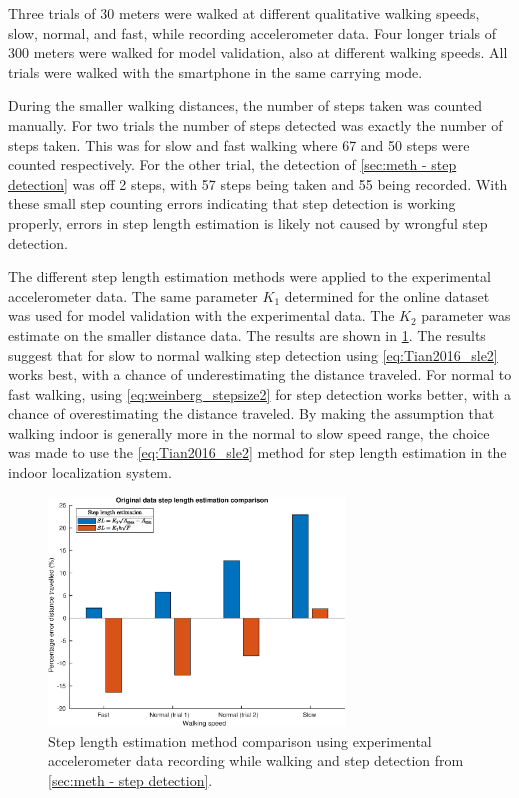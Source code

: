 Three trials of 30 meters were walked at different qualitative walking speeds, slow, normal, and fast, while recording accelerometer data. Four longer trials of 300 meters were walked for model validation, also at different walking speeds. All trials were walked with the smartphone in the same carrying mode. \par 

During the smaller walking distances, the number of steps taken was counted manually. For two trials the number of steps detected was exactly the number of steps taken. This was for slow and fast walking where 67 and 50 steps were counted respectively.  For the other trial, the detection of \cref{sec:meth - step detection} was off 2 steps, with 57 steps being taken and 55 being recorded. With these small step counting errors indicating that step detection is working properly, errors in step length estimation is likely not caused by wrongful step detection.  \par 

The different step length estimation methods were applied to the experimental accelerometer data. The same parameter $ K_1 $ determined for the online dataset was used for model validation with the experimental data. The $ K_2 $ parameter was estimate on the smaller distance data. The results are shown in \cref{fig:step_length_personal_testing}. The results suggest that for slow to normal walking step detection using \eqref{eq:Tian2016_sle2} works best, with a chance of underestimating the distance traveled. For normal to fast walking, using \eqref{eq:weinberg_stepsize2} for step detection works better, with a chance of overestimating the distance traveled. By making the assumption that walking indoor is generally more in the normal to slow speed range, the choice was made to use the \eqref{eq:Tian2016_sle2} method for step length estimation in the indoor localization system.
\begin{figure}[H]
	\centering
	\includegraphics[width=0.7\textwidth]{images/20201128_1430_original_data_step_length_estimation_comparison}
		\setlength{\belowcaptionskip}{-15pt}
	\caption{Step length estimation method comparison using experimental accelerometer data recording while walking and step detection from \cref{sec:meth - step detection}. }
	\label{fig:step_length_personal_testing}
\end{figure}

